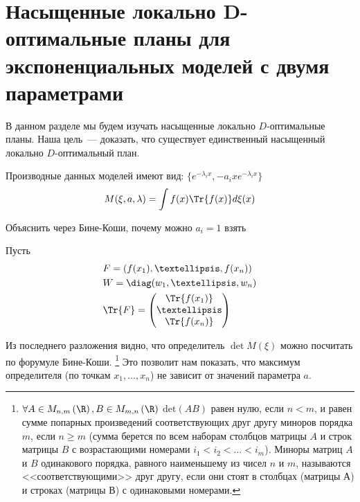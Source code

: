 \section{Насыщенные локально D-оптимальные планы для экспоненциальных моделей с двумя параметрами}

В данном разделе мы будем изучать насыщенные локально $D$-оптимальные планы. Наша цель — доказать, что существует единственный насыщенный локально $D$-оптимальный план.

Производные данных моделей имеют вид:
$\{e^{-\lambda_i x}, -a_i x e^{-\lambda_i x} \}$
$$M(\xi, a, \lambda) = \int f(x)\Tr{f(x)}d\xi(x)$$

{ \color{blue} Объяснить через Бине-Коши, почему можно $a_i = 1$ взять }

Пусть
\begin{equation}
\begin{split}
 &F = (f(x_1), …, f(x_n)) \\
 & W = \diag(w_1, …,w_n) \\
 & \Tr{F} = \begin{pmatrix} \Tr{f(x_1)} \\ … \\ \Tr{f(x_n)} \end{pmatrix} 
 \end{split}
 \end{equation}

 Из последнего разложения видно, что определитель $\det M(\xi)$ можно посчитать по форумуле Бине-Коши.
 \footnote{$\forall A\in M_{n,m}\left(\R\right), B\in M_{m,n}\left(\R\right)$ $\mathrm{det}\left(AB\right)$ равен нулю, если $n<m$, и равен сумме попарных произведений соответствующих друг другу миноров порядка $m$, если $n\geqslant m$ (сумма берется по всем наборам столбцов матрицы $A$ и строк матрицы $B$ с возрастающими номерами $i_1<i_2<\ldots<i_m$).
 Миноры матриц $A$ и $B$ одинакового порядка, равного наименьшему из чисел $n$ и $m$, называются <<соответствующими>> друг другу, если они стоят в столбцах (матрицы А) и строках (матрицы В) с одинаковыми номерами.}
 Это позволит нам показать, что максимум определителя (по точкам $x_1, \ldots, x_n$) не зависит от значений параметра $a$.

